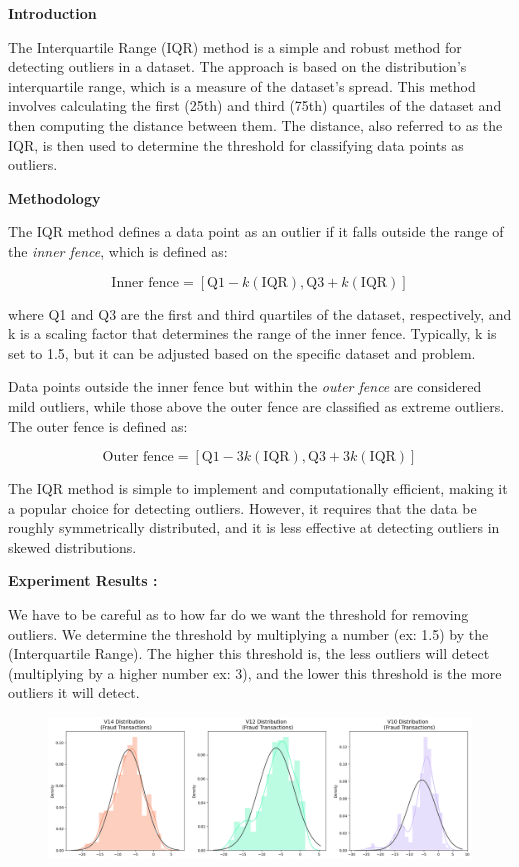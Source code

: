 \textbf{Introduction}

The Interquartile Range (IQR) method is a simple and robust method for detecting outliers in a dataset. The approach is based on the distribution's interquartile range, which is a measure of the dataset's spread. This method involves calculating the first (25th) and third (75th) quartiles of the dataset and then computing the distance between them. The distance, also referred to as the IQR, is then used to determine the threshold for classifying data points as outliers.

\textbf{Methodology}

The IQR method defines a data point as an outlier if it falls outside the range of the \textit{inner fence}, which is defined as:

\begin{equation} \textrm{Inner fence} = [\textrm{Q1} - k(\textrm{IQR}), \textrm{Q3} + k(\textrm{IQR})] \end{equation}

where Q1 and Q3 are the first and third quartiles of the dataset, respectively, and k is a scaling factor that determines the range of the inner fence. Typically, k is set to 1.5, but it can be adjusted based on the specific dataset and problem.

Data points outside the inner fence but within the \textit{outer fence} are considered mild outliers, while those above the outer fence are classified as extreme outliers. The outer fence is defined as:

\begin{equation} \textrm{Outer fence} = [\textrm{Q1} - 3k(\textrm{IQR}), \textrm{Q3} + 3k(\textrm{IQR})] \end{equation}

The IQR method is simple to implement and computationally efficient, making it a popular choice for detecting outliers. However, it requires that the data be roughly symmetrically distributed, and it is less effective at detecting outliers in skewed distributions.


\textbf{Experiment Results :}

We have to be careful as to how far do we want the threshold for removing outliers. We determine the threshold by multiplying a number (ex: 1.5) by the (Interquartile Range). The higher this threshold is, the less outliers will detect (multiplying by a higher number ex: 3), and the lower this threshold is the more outliers it will detect.  

\begin{figure}[h]
	\centering
	\includegraphics[width=0.7\linewidth]{../output9}
	\caption{}
	\label{Visualization of feature distribution}
\end{figure}


